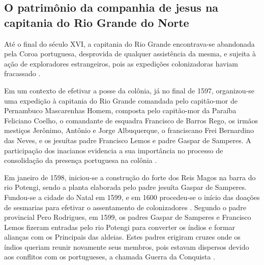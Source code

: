 \begin{refsection}
\section{O patrimônio da companhia de jesus na capitania do Rio Grande do Norte}

Até o final do século XVI, a capitania do Rio Grande encontrava-se abandonada pela Coroa portuguesa, desprovida de qualquer assistência da mesma, e sujeita à ação de exploradores estrangeiros, pois as expedições colonizadoras haviam fracassado
\cites[][p.~200]{Medeiros1985}{Pereira2018}.

Em um contexto de efetivar a posse da colônia, já no final de 1597, organizou-se uma expedição à capitania do Rio Grande comandada pelo capitão-mor de Pernambuco Mascarenhas Homem, composta pelo capitão-mor da Paraíba Feliciano Coelho, o comandante de esquadra Francisco de Barros Rego, os irmãos mestiços Jerônimo, Antônio e Jorge Albuquerque, o franciscano Frei Bernardino das Neves, e os jesuítas padre Francisco Lemos e padre Gaspar de Samperes. A participação dos inacianos evidencia a sua importância no processo de consolidação da presença portuguesa na colônia \cite[p.~34]{MarizAndSuassuna2002}. 

Em janeiro de 1598, iniciou-se a construção do forte dos Reis Magos na barra do rio Potengi, sendo a planta elaborada pelo padre jesuíta Gaspar de Samperes. Fundou-se a cidade do Natal em 1599, e em 1600 procedeu-se o início das doações de sesmarias para efetivar o assentamento de colonizadores \cite[p.~24,~44]{Cascudo1984}. Segundo o padre provincial Pero Rodrigues, em 1599, os padres Gaspar de Samperes e Francisco Lemos fizeram entradas pelo rio Potengi para converter os índios e formar alianças com os Principais das aldeias. Estes padres erigiram cruzes onde os índios queriam reunir novamente seus membros, pois estavam dispersos devido aos conflitos com os portugueses, a chamada Guerra da Conquista \cite[Tombo~V,~p.~361--363]{Leite2004}. 


\end{refsection}
